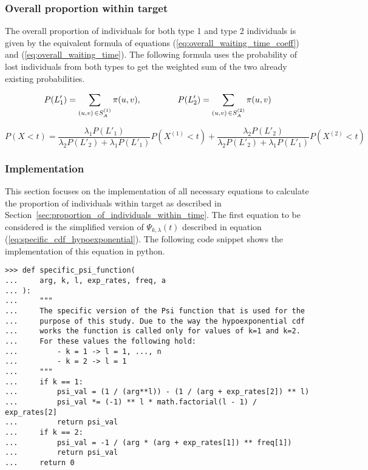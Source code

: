 \subsubsection{Overall proportion within target}

The overall proportion of individuals for both type 1 and type 2 individuals
is given by the equivalent formula of equations
(\ref{eq:overall_waiting_time_coeff}) and (\ref{eq:overall_waiting_time}).
The following formula uses the probability of lost individuals from both types
to get the weighted sum of the two already existing probabilities.

\begin{equation*}
    P(L'_1) = \sum_{(u,v) \, \in S_A^{(1)}} \pi(u,v), \hspace{1.5cm}
    P(L'_2) = \sum_{(u,v) \, \in S_A^{(2)}} \pi(u,v)
\end{equation*}

\small
\begin{equation}\label{eq:overall_proportion_within_target}
    P(X < t)= \frac{\lambda_1 P(L'_1)}{\lambda_2 P(L'_2)+\lambda_1 P(L'_1)}
    P(X^{(1)} < t) + \frac{\lambda_2 P(L'_2)}{\lambda_2 P(L'_2) + \lambda_1
    P(L'_1)} P(X^{(2)} < t)
\end{equation}
\normalsize

\subsubsection{Implementation}\label{sec:implementation_proportion_individuals}

This section focuses on the implementation of all necessary equations to 
calculate the proportion of individuals within target as described
in Section~\ref{sec:proportion_of_individuals_within_time}.
The first equation to be considered is the simplified version of
\(\Psi_{k, \lambda}(t)\) described in equation
(\ref{eq:specific_cdf_hypoexponential}).
The following code snippet shows the implementation of this equation in python.

\begin{lstlisting}[style=pystyle]
>>> def specific_psi_function(
...     arg, k, l, exp_rates, freq, a
... ):
...     """
...     The specific version of the Psi function that is used for the
...     purpose of this study. Due to the way the hypoexponential cdf
...     works the function is called only for values of k=1 and k=2. 
...     For these values the following hold:
...         - k = 1 -> l = 1, ..., n
...         - k = 2 -> l = 1
...     """
...     if k == 1:
...         psi_val = (1 / (arg**l)) - (1 / (arg + exp_rates[2]) ** l)
...         psi_val *= (-1) ** l * math.factorial(l - 1) / exp_rates[2]
...         return psi_val
...     if k == 2:
...         psi_val = -1 / (arg * (arg + exp_rates[1]) ** freq[1])
...         return psi_val
...     return 0

\end{lstlisting}


